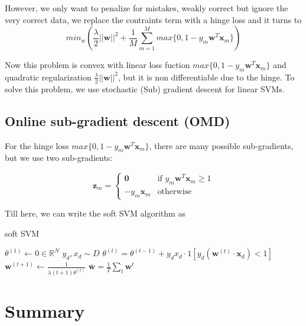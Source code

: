 \documentclass[11pt]{article}
\begin{document}
However, we only want to penalize for mistakes, weakly correct but ignore the very correct data, we replace the contraints term with a hinge loss and it turns to
\begin{equation}
     min_{w} (\frac{\lambda}{2}||\textbf{w}||^2 + \frac{1}{M} \sum_{m=1}^{M} max\{0, 1 - y_m \textbf{w}^T \textbf{x}_m\})
\end{equation}

Now this problem is convex with linear loss fuction $max\{0, 1 - y_m \textbf{w}^T \textbf{x}_m\}$ and quadratic regularization $\frac{\lambda}{2}||\textbf{w}||^2$, but it is non differentiable due to the hinge.
To solve this problem, we use stochastic (Sub) gradient descent for linear SVMs.

\subsection{Online sub-gradient descent (OMD)}
For the hinge loss $max\{0, 1 - y_m \textbf{w}^T \textbf{x}_m\}$, there are many possible sub-gradients, but we use two sub-gradients:

\begin{equation}
  \textbf{z}_m =
    \begin{cases}
      \textbf{0} & \text{if $y_m \textbf{w}^T \textbf{x}_m \geq 1$}\\
      -y_m \textbf{x}_m & \text{otherwise}
    \end{cases}       
\end{equation}

Till here, we can write the soft SVM algorithm as 

\begin{algorithm}
\caption{soft SVM}
\begin{algorithmic}[1]

\State $\theta^{(1)} \leftarrow 0 \in \mathbb{R}^N$
        \State $y_d, x_d \sim D$
        \State $\theta^{(t)} = \theta^{(t-1)} + y_d x_d \cdot 1[y_d (\textbf{w}^{(t)} \cdot \textbf{x}_d) < 1]$
        \State $\textbf{w}^{(t+1)} \leftarrow \frac{1}{\lambda (t+1)\theta^{(t)}}$
    \EndFor
\State $\bar{\textbf{w}} = \frac{1}{T} \sum_{t} \textbf{w}^t$

\end{algorithmic}
\end{algorithm}


\section{Summary}
\end{document}
